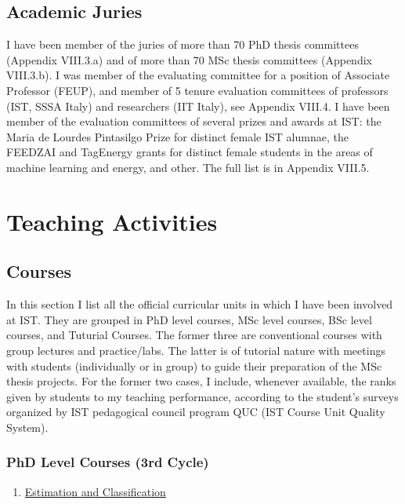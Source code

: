 \documentclass[
]{article}
\begin{document}
\subsection{Academic Juries}\label{academic-juries}

I have been member of the juries of more than 70 PhD thesis committees
(Appendix VIII.3.a) and of more than 70 MSc thesis committees (Appendix
VIII.3.b). I was member of the evaluating committee for a position of
Associate Professor (FEUP), and member of 5 tenure evaluation committees
of professors (IST, SSSA Italy) and researchers (IIT Italy), see
Appendix VIII.4. I have been member of the evaluation committees of
several prizes and awards at IST: the Maria de Lourdes Pintasilgo Prize
for distinct female IST alumnae, the FEEDZAI and TagEnergy grants for
distinct female students in the areas of machine learning and energy,
and other. The full list is in Appendix VIII.5.

\section{Teaching Activities}\label{teaching-activities}

\subsection{Courses}\label{courses-1}

In this section I list all the official curricular units in which I have
been involved at IST. They are grouped in PhD level courses, MSc level
courses, BSc level courses, and Tuturial Courses. The former three are
conventional courses with group lectures and practice/labs. The latter
is of tutorial nature with meetings with students (individually or in
group) to guide their preparation of the MSc thesis projects. For the
former two cases, I include, whenever available, the ranks given by
students to my teaching performance, according to the student's surveys
organized by IST pedagogical council program QUC (IST Course Unit
Quality System).

\subsubsection{PhD Level Courses (3rd
Cycle)}\label{phd-level-courses-3rd-cycle}

\begin{enumerate}
\def\labelenumi{\arabic{enumi}.}
\item
  \ul{Estimation and Classification}
\end{enumerate}
\end{document}
